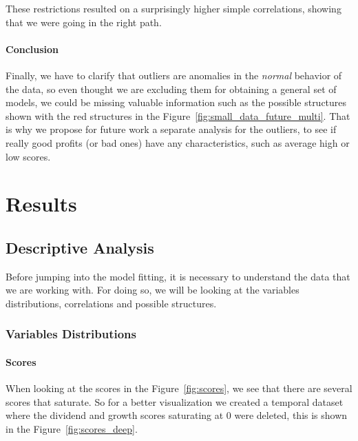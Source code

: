 \documentclass[11pt,english,a4paper,hidelinks]{book}
\begin{document}
\noindent These restrictions resulted on a surprisingly higher simple correlations, showing that we were going in the right path.

\subsubsection{Conclusion}

\noindent Finally, we have to clarify that outliers are anomalies in the \textit{normal} behavior of the data, so even thought we are excluding them for obtaining a general set of models, we could be missing valuable information such as the possible structures shown with the red structures in the Figure~\ref{fig:small_data_future_multi}. That is why we propose for future work a separate analysis for the outliers, to see if really good profits (or bad ones) have any characteristics, such as average high or low scores.


\chapter{Results}
\section{Descriptive Analysis}

Before jumping into the model fitting, it is necessary to understand the data that we are working with. For doing so, we will be looking at the variables distributions, correlations and possible structures.

\subsection{Variables Distributions}

\subsubsection{Scores}
When looking at the scores in the Figure~\ref{fig:scores}, we see that there are several scores that saturate. So for a better visualization we created a temporal dataset where the dividend and growth scores saturating at 0 were deleted, this is shown in the Figure~\ref{fig:scores_deep}. 
\end{document}
